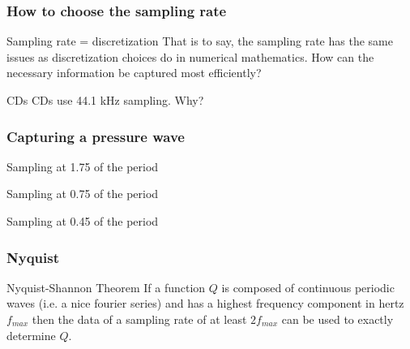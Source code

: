 \documentclass[10pt]{beamer}
\begin{document}
\begin{frame}
\frametitle{How to choose the sampling rate}
\begin{block}{Sampling rate = discretization}
That is to say, the sampling rate has the same issues as discretization choices do in numerical mathematics. How can the necessary information be captured most efficiently?
\end{block}

\begin{block}{CDs}
CDs use 44.1 kHz sampling. Why?
\end{block}
\end{frame}

\begin{frame}
\frametitle{Capturing a pressure wave}
\begin{block}{Sampling at 1.75 of the period}
\end{block}

\begin{block}{Sampling at 0.75 of the period}
\end{block}

\begin{block}{Sampling at 0.45 of the period}
\end{block}
\end{frame}

\begin{frame}
\frametitle{Nyquist}

\begin{block}{Nyquist-Shannon Theorem}
If a function $Q$ is composed of continuous periodic waves (i.e. a nice fourier series) and has a highest frequency component in hertz  $f_{max}$ then the data of a sampling rate of at least $2f_{max}$ can be used to exactly determine $Q$.
\end{block}

\end{frame}
\end{document}
